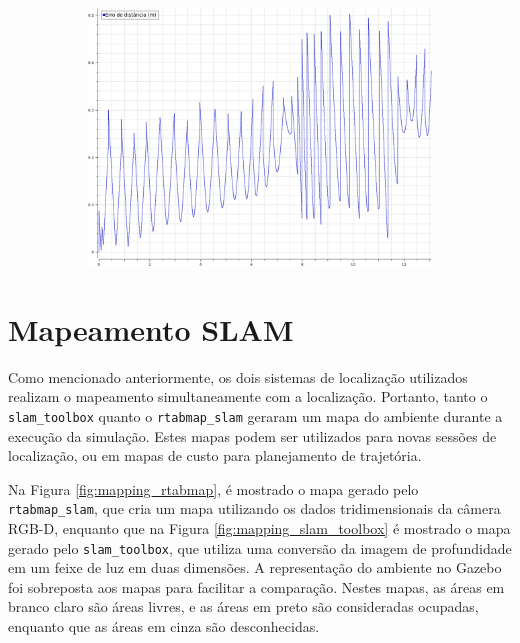 \documentclass[repeatfields,xlists,xpacks,oneside,yearsonly]{ufrgscca}
\begin{document}
\begin{figure}[h]
\begin{subfigure}{0.5\linewidth}
{            \includegraphics[width=0.98\linewidth]{localization-slam-toolbox-error.png}\\
        }
    \end{subfigure}
\end{figure}

\section{Mapeamento SLAM}

Como mencionado anteriormente, os dois sistemas de localização
utilizados realizam o mapeamento simultaneamente com a localização.
Portanto, tanto o \texttt{slam\_toolbox} quanto o
\texttt{rtabmap\_slam} geraram um mapa do ambiente durante a execução
da simulação. Estes mapas podem ser utilizados para novas sessões de
localização, ou em mapas de custo para planejamento de trajetória.

Na Figura \ref{fig:mapping_rtabmap}, é mostrado o mapa gerado pelo
\texttt{rtabmap\_slam}, que cria um mapa utilizando os dados
tridimensionais da câmera RGB-D, enquanto que na Figura
\ref{fig:mapping_slam_toolbox} é mostrado o mapa gerado pelo
\texttt{slam\_toolbox}, que utiliza uma conversão da imagem de
profundidade em um feixe de luz em duas dimensões. A representação do
ambiente no Gazebo foi sobreposta aos mapas para facilitar a
comparação. Nestes mapas, as áreas em branco claro são áreas livres,
e as áreas em preto são consideradas ocupadas, enquanto que as áreas
em cinza são desconhecidas.
\end{document}
